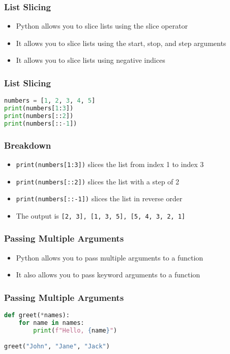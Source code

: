 \documentclass[serif, 9pt, aspectratio=32]{beamer}
\begin{document}
\begin{frame}
    \centering
    \frametitle{List Slicing}
    \begin{itemize}
        \setlength{\itemsep}{2em}
        \item Python allows you to slice lists using the slice operator
        \item It allows you to slice lists using the start, stop, and step arguments
        \item It allows you to slice lists using negative indices
    \end{itemize}
\end{frame}

\begin{frame}[fragile]
    \frametitle{List Slicing}
    \begin{lstlisting}[language=Python]
numbers = [1, 2, 3, 4, 5]
print(numbers[1:3])
print(numbers[::2])
print(numbers[::-1])
    \end{lstlisting}
\end{frame}

\begin{frame}
    \centering
    \frametitle{Breakdown}
    \begin{itemize}
        \setlength{\itemsep}{2em}
        \item \texttt{print(numbers[1:3])} slices the list from index 1 to index 3
        \item \texttt{print(numbers[::2])} slices the list with a step of 2
        \item \texttt{print(numbers[::-1])} slices the list in reverse order
        \item The output is \texttt{[2, 3], [1, 3, 5], [5, 4, 3, 2, 1]}
    \end{itemize}
\end{frame}

\begin{frame}
    \centering
    \frametitle{Passing Multiple Arguments}
    \begin{itemize}
        \setlength{\itemsep}{2em}
        \item Python allows you to pass multiple arguments to a function
        \item It also allows you to pass keyword arguments to a function
    \end{itemize}
\end{frame}

\begin{frame}[fragile]
    \frametitle{Passing Multiple Arguments}
    \begin{lstlisting}[language=Python]
def greet(*names):
    for name in names:
        print(f"Hello, {name}")

greet("John", "Jane", "Jack")
    \end{lstlisting}
\end{frame}
\end{document}
